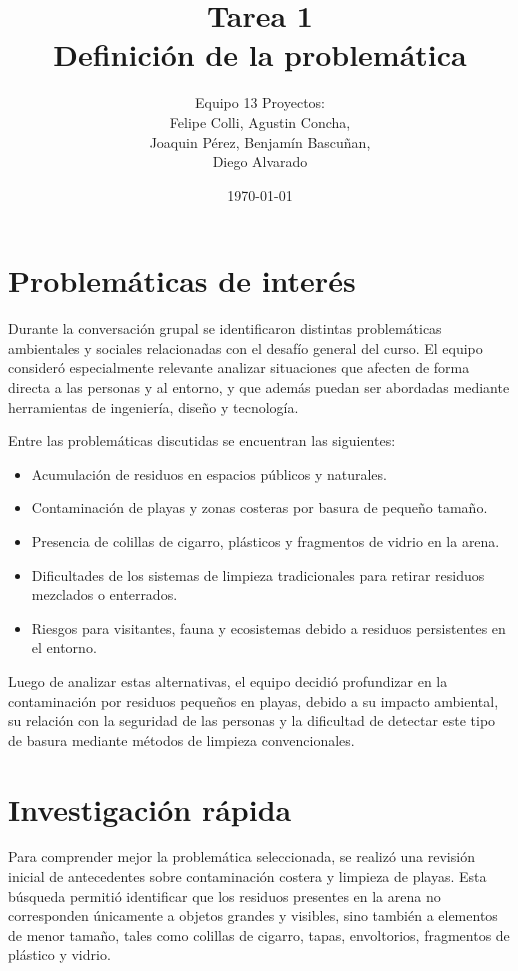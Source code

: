 \documentclass[11pt]{article}
\title{Tarea 1\\Definición de la problemática}
\author{Equipo 13 Proyectos: \\ Felipe Colli, Agustin Concha,\\ Joaquin Pérez, Benjamín Bascuñan,\\ Diego Alvarado}
\date{\today}
\begin{document}
\maketitle
\thispagestyle{fancy}

\section{Problemáticas de interés}

Durante la conversación grupal se identificaron distintas problemáticas ambientales y sociales relacionadas con el desafío general del curso. El equipo consideró especialmente relevante analizar situaciones que afecten de forma directa a las personas y al entorno, y que además puedan ser abordadas mediante herramientas de ingeniería, diseño y tecnología.

Entre las problemáticas discutidas se encuentran las siguientes:

\begin{itemize}
    \item Acumulación de residuos en espacios públicos y naturales.
    \item Contaminación de playas y zonas costeras por basura de pequeño tamaño.
    \item Presencia de colillas de cigarro, plásticos y fragmentos de vidrio en la arena.
    \item Dificultades de los sistemas de limpieza tradicionales para retirar residuos mezclados o enterrados.
    \item Riesgos para visitantes, fauna y ecosistemas debido a residuos persistentes en el entorno.
\end{itemize}

Luego de analizar estas alternativas, el equipo decidió profundizar en la contaminación por residuos pequeños en playas, debido a su impacto ambiental, su relación con la seguridad de las personas y la dificultad de detectar este tipo de basura mediante métodos de limpieza convencionales.

\section{Investigación rápida}

Para comprender mejor la problemática seleccionada, se realizó una revisión inicial de antecedentes sobre contaminación costera y limpieza de playas. Esta búsqueda permitió identificar que los residuos presentes en la arena no corresponden únicamente a objetos grandes y visibles, sino también a elementos de menor tamaño, tales como colillas de cigarro, tapas, envoltorios, fragmentos de plástico y vidrio.
\end{document}
